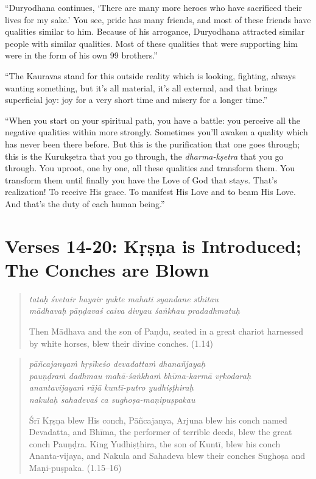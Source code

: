 \documentclass[12pt, twoside, openright]{memoir}
\begin{document}
\enquote{Duryodhana continues, \enquote{There are many more heroes who have sacrificed their lives for my sake.} You see, pride has many friends, and most of these friends have qualities similar to him. Because of his arrogance, Duryodhana attracted similar people with similar qualities. Most of these qualities that were supporting him were in the form of his own 99 brothers.}

\enquote{The Kauravas stand for this outside reality which is looking, fighting, always wanting something, but it’s all material, it’s all external, and that brings superficial joy: joy for a very short time and misery for a longer time.}

\enquote{When you start on your spiritual path, you have a battle: you perceive all the negative qualities within more strongly. Sometimes you’ll awaken a quality which has never been there before. But this is the purification that one goes through; this is the Kurukṣetra that you go through, the \textit{dharma-kṣetra} that you go through. You uproot, one by one, all these qualities and transform them. You transform them until finally you have the Love of God that stays. That’s realization! To receive His grace. To manifest His Love and to beam His Love. And that's the duty of each human being.}

\section{Verses 14-20: Kṛṣṇa is Introduced; The Conches are Blown}\label{sec-verses-14-20-krsna-is-introduced-the-conches-are-blown}


\par
\begin{verse}
\textit{tataḥ śvetair hayair yukte mahati syandane sthitau} \\
\textit{mādhavaḥ pāṇḍavaś caiva divyau śaṅkhau pradadhmatuḥ}

\noindent Then Mādhava and the son of Paṇḍu, seated in a great chariot harnessed by white horses, blew their divine conches. (1.14)
\end{verse}
\par



\par
\begin{verse}
\textit{pāñcajanyaṁ hṛṣīkeśo devadattaṁ dhanañjayaḥ} \\
\textit{pauṇḍraṁ dadhmau mahā-śaṅkhaṁ bhīma-karmā vṛkodaraḥ} \\
\textit{anantavijayaṁ rājā kuntī-putro yudhiṣṭhiraḥ} \\
\textit{nakulaḥ sahadevaś ca sughoṣa-maṇipuṣpakau}

\noindent Śrī Kṛṣṇa blew His conch, Pāñcajanya, Arjuna blew his conch named Devadatta, and Bhīma, the performer of terrible deeds, blew the great conch Pauṇḍra. King Yudhiṣṭhira, the son of Kuntī, blew his conch Ananta-vijaya, and Nakula and Sahadeva blew their conches Sughoṣa and Maṇi-puṣpaka. (1.15–16)
\end{verse}
\par
\end{document}
